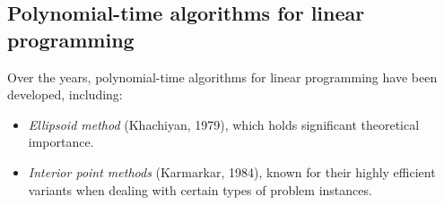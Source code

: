 \subsection{Polynomial-time algorithms for linear programming}
Over the years, polynomial-time algorithms for linear programming have been developed, including:
\begin{itemize}
    \item \textit{Ellipsoid method} (Khachiyan, 1979), which holds significant theoretical importance.
    \item \textit{Interior point methods} (Karmarkar, 1984), known for their highly efficient variants when dealing with certain types of problem instances. 
\end{itemize}